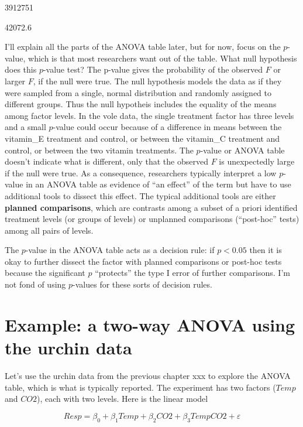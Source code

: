 \documentclass[]{book}
\begin{document}
3912751

42072.6

I'll explain all the parts of the ANOVA table later, but for now, focus on the \(p\)-value, which is that most researchers want out of the table. What null hypothesis does this \(p\)-value test? The p-value gives the probability of the observed \(F\) or larger \(F\), if the null were true. The null hypothesis models the data as if they were sampled from a single, normal distribution and randomly assigned to different groups. Thus the null hypotheis includes the equality of the means among factor levels. In the vole data, the single treatment factor has three levels and a small \(p\)-value could occur because of a difference in means between the vitamin\_E treatment and control, or between the vitamin\_C treatment and control, or between the two vitamin treatments. The \(p\)-value or ANOVA table doesn't indicate what is different, only that the observed \(F\) is unexpectedly large if the null were true. As a consequence, researchers typically interpret a low \(p\)-value in an ANOVA table as evidence of ``an effect'' of the term but have to use additional tools to dissect this effect. The typical additional tools are either \textbf{planned comparisons}, which are contrasts among a subset of a priori identified treatment levels (or groups of levels) or unplanned comparisons (``post-hoc'' tests) among all pairs of levels.

The \(p\)-value in the ANOVA table acts as a decision rule: if \(p < 0.05\) then it is okay to further dissect the factor with planned comparisons or post-hoc tests because the significant \(p\) ``protects'' the type I error of further comparisons. I'm not fond of using \(p\)-values for these sorts of decision rules.

\hypertarget{example-a-two-way-anova-using-the-urchin-data}{%
\section{Example: a two-way ANOVA using the urchin data}\label{example-a-two-way-anova-using-the-urchin-data}}

Let's use the urchin data from the previous chapter xxx to explore the ANOVA table, which is what is typically reported. The experiment has two factors (\(Temp\) and \(CO2\)), each with two levels. Here is the linear model

\begin{equation}
Resp = \beta_0 + \beta_1 Temp + \beta_2 CO2 + \beta_3 TempCO2 + \varepsilon
\end{equation}
\end{document}
